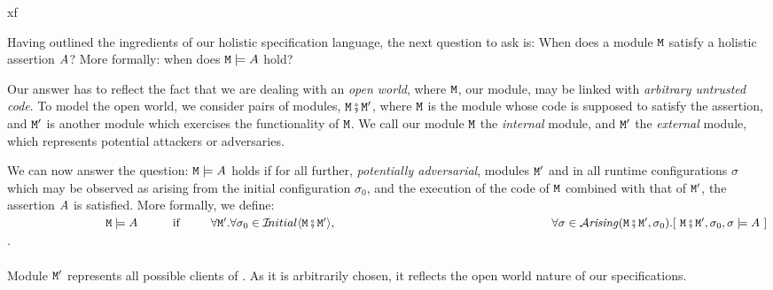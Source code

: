 xf%

Having outlined the ingredients of our holistic specification
language, the next question to ask is: When does a module ${\mbox{\tt{\ensuremath{{\mbox{\tt{M}}}}}}}$ satisfy
a holistic assertion $A$?  More formally: when does
${\mbox{\tt{\ensuremath{{\mbox{\tt{M}}}}}}} \models A$ 
hold? 
  
Our answer has to reflect the fact that we are dealing with an  
\emph{open  world},  where  ${\mbox{\tt{\ensuremath{{\mbox{\tt{M}}}}}}}$, our module, may be
linked with \textit{arbitrary untrusted code}.
%
%
%
%
To %
 model the open world, we consider
 pairs of modules, 
${\mbox{\tt{\ensuremath{{\mbox{\tt{M}}}}}}} \fatsemi {{\mbox{\tt{\ensuremath{{\mbox{\tt{M}}}}}}}'}$,  where ${\mbox{\tt{\ensuremath{{\mbox{\tt{M}}}}}}}$ is the module 
whose code is supposed to satisfy the assertion,
and ${\mbox{\tt{\ensuremath{{\mbox{\tt{M}}}}}}}'$  is  another %
 module which exercises
the functionality of ${\mbox{\tt{\ensuremath{{\mbox{\tt{M}}}}}}}$. We call our module ${\mbox{\tt{\ensuremath{{\mbox{\tt{M}}}}}}}$ the {\em internal} module, and
 ${\mbox{\tt{\ensuremath{{\mbox{\tt{M}}}}}}}'$ the {\em external} module, which represents potential
 attackers or adversaries.
     
We can now answer the question: ${\mbox{\tt{\ensuremath{{\mbox{\tt{M}}}}}}} \models A$ 
 holds if for all further, {\em potentially adversarial}, modules ${\mbox{\tt{\ensuremath{{\mbox{\tt{M}}}}}}}'$ and in  all runtime configurations $\sigma$ which may be observed as arising from the initial configuration $\sigma_0$, and the execution of the code of ${\mbox{\tt{\ensuremath{{\mbox{\tt{M}}}}}}}$ combined with that of ${\mbox{\tt{\ensuremath{{\mbox{\tt{M}}}}}}}'$, the assertion $A$ is satisfied. More formally, we define:\\
 
$~ \strut  \hspace{1.1in} \M \models \A \ \ \  \ \ \ \ \ \mbox{
if               } \ \ \  \ \ \  \  \forall \M'.\forall \sigma_0 \in \Initial{\M \mkpair \M'}, \\ ~ \strut \hspace{2.5in}
\forall\sigma\in\Arising{\M \mkpair  {\M'}, \sigma_0}. [\ \M \mkpair  {\M'}, \sigma_0 , \sigma \models \A\ ]$. \\\\
Module ${\mbox{\tt{\ensuremath{{\mbox{\tt{M}}}}}}}'$ represents all possible clients of {\M}.  As it is arbitrarily chosen, it reflects the open world nature of our specifications.%

